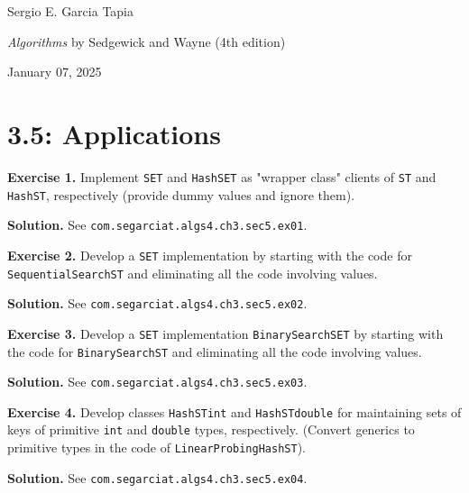 \documentclass[12pt, a4paper]{article}
\newenvironment{ex}[2][Exercise]
{\par\medskip\noindent \textbf{#1 #2.}}
{\medskip}
\newenvironment{sol}[1][Solution]
{\par\medskip\noindent \textbf{#1.} }
{\medskip}
\begin{document}
	\noindent Sergio E. Garcia Tapia \hfill
	
	\noindent \emph{Algorithms} by Sedgewick and Wayne (4th edition) \cite{sedgewick_wayne}\hfill
	
	\noindent January 07, 2025\hfill 
	\section*{3.5: Applications}
	\begin{ex}{1}
		Implement \texttt{SET} and \texttt{HashSET} as "wrapper class" clients of \texttt{ST}
		and \texttt{HashST}, respectively (provide dummy values and ignore them).
	\end{ex}
	\begin{sol}
		See \texttt{com.segarciat.algs4.ch3.sec5.ex01}.
	\end{sol}
	\begin{ex}{2}
		Develop a \texttt{SET} implementation by starting with the code for \texttt{SequentialSearchST}
		and eliminating all the code involving values.
	\end{ex}
	\begin{sol}
		See \texttt{com.segarciat.algs4.ch3.sec5.ex02}.
	\end{sol}
	\begin{ex}{3}
		Develop a \texttt{SET} implementation \texttt{BinarySearchSET} by starting with the code for
		\texttt{BinarySearchST} and eliminating all the code involving values.
	\end{ex}
	\begin{sol}
		See \texttt{com.segarciat.algs4.ch3.sec5.ex03}.
	\end{sol}
	\begin{ex}{4}
		Develop classes \texttt{HashSTint} and \texttt{HashSTdouble} for maintaining sets of keys of
		primitive \texttt{int} and \texttt{double} types, respectively. (Convert generics to primitive
		types in the code of \texttt{LinearProbingHashST}).
	\end{ex}
	\begin{sol}
		See \texttt{com.segarciat.algs4.ch3.sec5.ex04}.
	\end{sol}
	\pagebreak
	\printbibliography
\end{document}
